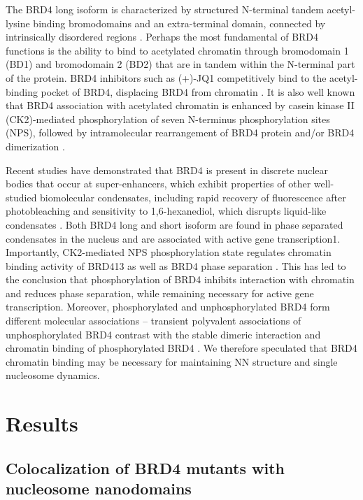 The BRD4 long isoform is characterized by structured N-terminal tandem acetyl-lysine binding bromodomains and an extra-terminal domain, connected by intrinsically disordered regions \parencite{Han2020}. Perhaps the most fundamental of BRD4 functions is the ability to bind to acetylated chromatin through bromodomain 1 (BD1) and bromodomain 2 (BD2) that are in tandem within the N-terminal part of the protein. BRD4 inhibitors such as (+)-JQ1 competitively bind to the acetyl-binding pocket of BRD4, displacing BRD4 from chromatin \parencite{Filippakopoulos2010}. It is also well known that BRD4 association with acetylated chromatin is enhanced by casein kinase II (CK2)-mediated phosphorylation of seven N-terminus phosphorylation sites (NPS), followed by intramolecular rearrangement of BRD4 protein and/or BRD4 dimerization \parencite{Wu2013,Malvezzi2021}.

Recent studies have demonstrated that BRD4 is present in discrete nuclear bodies that occur at super-enhancers, which exhibit properties of other well-studied biomolecular condensates, including rapid recovery of fluorescence after photobleaching and sensitivity to 1,6-hexanediol, which disrupts liquid-like condensates \parencite{Sabari2018}. Both BRD4 long and short isoform are found in phase separated condensates in the nucleus and are associated with active gene transcription1. Importantly, CK2-mediated NPS phosphorylation state regulates chromatin binding activity of BRD413 as well as BRD4 phase separation \parencite{Han2020}. This has led to the conclusion that phosphorylation of BRD4 inhibits interaction with chromatin and reduces phase separation, while remaining necessary for active gene transcription. Moreover, phosphorylated and unphosphorylated BRD4 form different molecular associations – transient polyvalent associations of unphosphorylated BRD4 contrast with the stable dimeric interaction and chromatin binding of phosphorylated BRD4 \parencite{Malvezzi2021}. We therefore speculated that BRD4 chromatin binding may be necessary for maintaining NN structure and single nucleosome dynamics. 

\section{Results}

\subsection{Colocalization of BRD4 mutants with nucleosome nanodomains}

